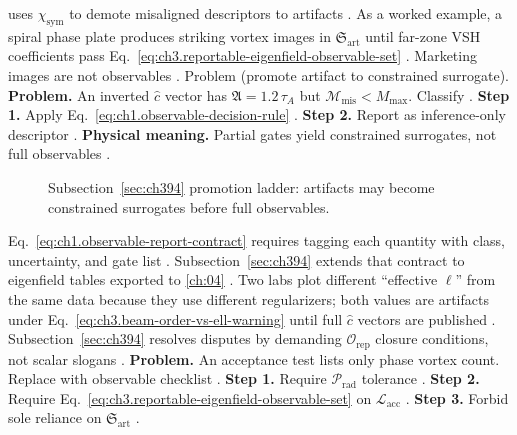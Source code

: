 uses \(\chi_{\mathrm{sym}}\) to demote misaligned descriptors to artifacts \cite{harrington2001}.
As a worked example, a spiral phase plate produces striking vortex images in \(\mathfrak{S}_{\mathrm{art}}\) until far-zone VSH coefficients pass
Eq.~\eqref{eq:ch3.reportable-eigenfield-observable-set} \cite{allen1992}. Marketing images are not
observables \cite{harrington2001}.
Problem (promote artifact to constrained surrogate). \textbf{Problem.} An inverted \(\widehat{c}\) vector has \(\mathfrak{A}=1.2\,\tau_A\) but \(\mathcal{M}_{\mathrm{mis}}<M_{\max}\). Classify
\cite{harrington2001}.
\textbf{Step 1.} Apply Eq.~\eqref{eq:ch1.observable-decision-rule} \cite{harrington2001}.
\textbf{Step 2.} Report as inference-only descriptor \cite{stratton1941}.
\textbf{Physical meaning.} Partial gates yield constrained surrogates, not full observables \cite{harrington2001}.
\begin{figure}[t]
\centering
{}
\caption{Subsection~\ref{sec:ch394} promotion ladder: artifacts may become constrained surrogates before full observables.}
\label{fig:ch3.394-promotion-ladder}
\end{figure}
Eq.~\eqref{eq:ch1.observable-report-contract} requires tagging each quantity with class, uncertainty, and gate list
\cite{harrington2001}. Subsection~\ref{sec:ch394} extends that contract to eigenfield tables exported to \ref{ch:04}
\cite{harrington2001}.
Two labs plot different ``effective \(\ell\)'' from the same data because they use different regularizers; both values are artifacts under
Eq.~\eqref{eq:ch3.beam-order-vs-ell-warning} until full \(\widehat{c}\) vectors are published \cite{harrington2001}.
Subsection~\ref{sec:ch394} resolves disputes by demanding \(\mathcal{O}_{\mathrm{rep}}\) closure conditions, not scalar slogans \cite{hansen1988}.
\textbf{Problem.} An acceptance test lists only phase vortex count. Replace with observable checklist
\cite{harrington2001}.
\textbf{Step 1.} Require \(\mathcal{P}_{\mathrm{rad}}\) tolerance \cite{poynting1884}.
\textbf{Step 2.} Require Eq.~\eqref{eq:ch3.reportable-eigenfield-observable-set} on \(\mathcal{L}_{\mathrm{acc}}\) \cite{harrington2001}.
\textbf{Step 3.} Forbid sole reliance on \(\mathfrak{S}_{\mathrm{art}}\) \cite{belinfante1940}.
